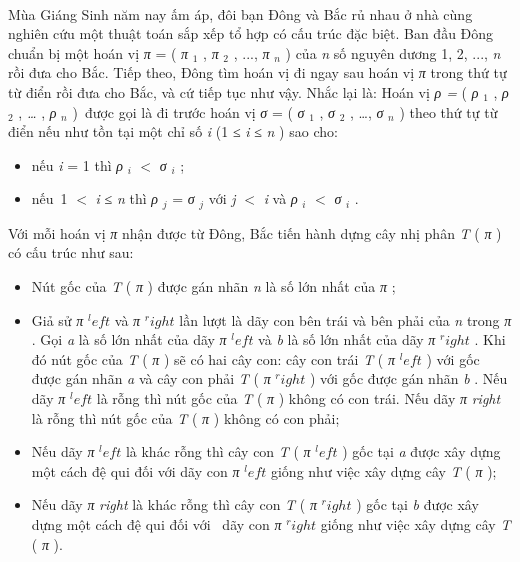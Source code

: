 

 

Mùa Giáng Sinh năm nay ấm áp, đôi bạn Đông và Bắc rủ nhau ở nhà cùng nghiên cứu một thuật toán sắp xếp tổ hợp có cấu trúc đặc biệt. Ban đầu Đông chuẩn bị một hoán vị \emph{ π } = ( \emph{ π }$_ 1 $ , \emph{ π }$_ 2 $ , ..., \emph{ π }\emph{$_ n $} ) của \emph{ n } số nguyên dương 1, 2, ..., \emph{ n } rồi đưa cho Bắc. Tiếp theo, Đông tìm hoán vị đi ngay sau hoán vị \emph{ π } trong thứ tự từ điển rồi đưa cho Bắc, và cứ tiếp tục như vậy. Nhắc lại là: Hoán vị \emph{ ρ = } ( \emph{ ρ }$_ 1 $ , \emph{ ρ }$_ 2 $ , \emph{ … } , \emph{ ρ }\emph{$_ n $} ) được gọi là đi trước hoán vị \emph{ σ } = ( \emph{ σ }$_ 1 $ , \emph{ σ }$_ 2 $ , …, \emph{ σ }\emph{$_ n $} ) theo thứ tự từ điển nếu như tồn tại một chỉ số \emph{ i } (1 ≤ \emph{ i } ≤ \emph{ n } ) sao cho:
\begin{itemize}
	\item nếu \emph{ i } = 1 thì \emph{ ρ }\emph{$_ i $} $<$ \emph{ σ }\emph{$_ i $} ;
	\item nếu 1 $<$ \emph{ i } ≤ \emph{ n } thì \emph{ ρ }\emph{$_ j $} = \emph{ σ }\emph{$_ j $}\emph{} với \emph{ j } $<$ \emph{ i } và \emph{ ρ }\emph{$_ i $} $<$ \emph{ σ }\emph{$_ i $} .
\end{itemize}

Với mỗi hoán vị \emph{ π } nhận được từ Đông, Bắc tiến hành dựng cây nhị phân \emph{ T } ( \emph{ π } ) có cấu trúc như sau:
\begin{itemize}
	\item Nút gốc của \emph{ T } ( \emph{ π } ) được gán nhãn \emph{ n } là số lớn nhất của \emph{ π } ;
	\item Giả sử \emph{ π }\emph{$^ left $}\emph{} và \emph{ π }\emph{$^ right $}\emph{} lần lượt là dãy con bên trái và bên phải của \emph{ n } trong \emph{ π } . Gọi \emph{ a } là số lớn nhất của dãy \emph{ π }\emph{$^ left $}\emph{} và \emph{ b } là số lớn nhất của dãy \emph{ π }\emph{$^ right $} . Khi đó nút gốc của \emph{ T } ( \emph{ π } ) sẽ có hai cây con: cây con trái \emph{ T } ( \emph{ π }\emph{$^ left $} ) với gốc được gán nhãn \emph{ a } và cây con phải \emph{ T } ( \emph{ π }\emph{$^ right $} ) với gốc được gán nhãn \emph{ b } . Nếu dãy \emph{ π }\emph{$^ left $}\emph{} là rỗng thì nút gốc của \emph{ T } ( \emph{ π } ) không có con trái. Nếu dãy \emph{ π }\emph{ right }\emph{} là rỗng thì nút gốc của \emph{ T } ( \emph{ π } ) không có con phải;
	\item Nếu dãy \emph{ π }\emph{$^ left $}\emph{} là khác rỗng thì cây con \emph{ T } ( \emph{ π }\emph{$^ left $} ) gốc tại \emph{ a } được xây dựng một cách đệ qui đối với dãy con \emph{ π }\emph{$^ left $}\emph{} giống như việc xây dựng cây \emph{ T } ( \emph{ π } );
	\item Nếu dãy \emph{ π }\emph{ right }\emph{} là khác rỗng thì cây con \emph{ T } ( \emph{ π }\emph{$^ right $} ) gốc tại \emph{ b } được xây dựng một cách đệ qui đối với  dãy con \emph{ π }\emph{$^ right $}\emph{} giống như việc xây dựng cây \emph{ T } ( \emph{ π } ).
\end{itemize}

